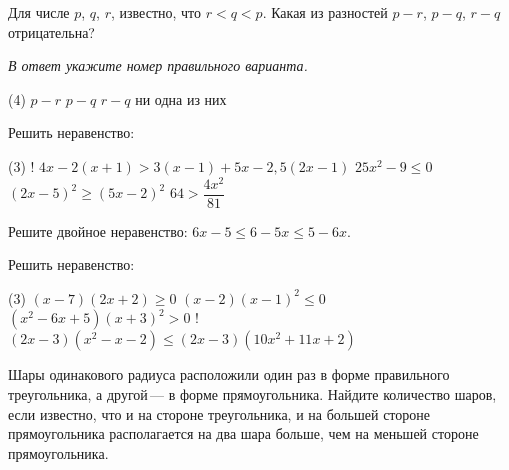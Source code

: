 %
%
%
%	

%
%
\begin{class}[number=7]
	\begin{listofex}
		\item Для числе \( p \), \( q \), \( r \), известно, что \( r<q<p \). Какая из разностей \( p-r \), \( p-q \), \( r-q \) отрицательна?
		
		\textit{В ответ укажите номер правильного варианта.}
		\begin{tasks}(4)
			\task \( p-r \)
			\task \( p-q \)
			\task \( r-q \)
			\task ни одна из них
		\end{tasks}
		\item Решить неравенство:
		\begin{tasks}(3)
			\task! \( 4x-2(x+1)>3(x-1)+5x-2,5(2x-1) \)
			\task \( 25x^2-9\le0 \)
			\task \( (2x-5)^2\ge(5x-2)^2 \)
			\task \( 64>\dfrac{4x^2}{81} \)
		\end{tasks}
		\item Решите двойное неравенство: \( 6x-5\le6-5x\le5-6x \).
		\item Решить неравенство:
		\begin{tasks}(3)
			\task \( (x-7)(2x+2)\ge0 \)
			\task \( (x-2)(x-1)^2\le0 \)
			\task \( (x^2-6x+5)(x+3)^2>0 \)
			\task! \( (2x-3)(x^2-x-2)\le(2x-3)(10x^2+11x+2) \)
		\end{tasks}
		\item Шары одинакового радиуса расположили один раз в форме правильного треугольника,
		а другой --- в форме прямоугольника. Найдите количество шаров,
		если известно, что и на стороне треугольника,
		и на большей стороне прямоугольника располагается на два шара больше,
		чем на меньшей стороне прямоугольника.
	\end{listofex}
\end{class}
%
%
